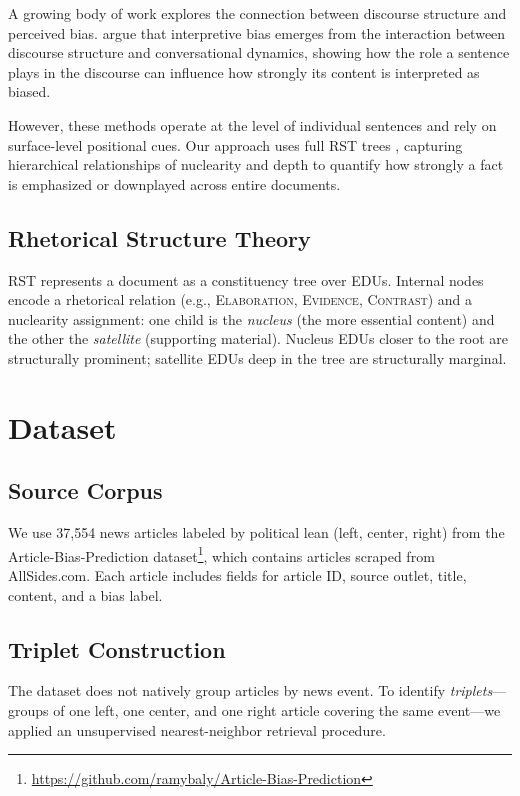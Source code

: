 \documentclass[11pt]{article}
\begin{document}
A growing body of work explores the connection between discourse structure and perceived bias. \citet{asher2018biassemanticdiscourseinterpretation} argue that interpretive bias emerges from the interaction between discourse structure and conversational dynamics, showing how the role a sentence plays in the discourse can influence how strongly its content is interpreted as biased.

However, these methods operate at the level of individual sentences and rely on surface-level positional cues. Our approach uses full RST trees \citep{nguyen2021rstparsingscratch}, capturing hierarchical relationships of nuclearity and depth to quantify how strongly a fact is emphasized or downplayed across entire documents.

\subsection{Rhetorical Structure Theory}

RST represents a document as a constituency tree over EDUs. Internal nodes encode a rhetorical relation (e.g., \textsc{Elaboration}, \textsc{Evidence}, \textsc{Contrast}) and a nuclearity assignment: one child is the \emph{nucleus} (the more essential content) and the other the \emph{satellite} (supporting material). Nucleus EDUs closer to the root are structurally prominent; satellite EDUs deep in the tree are structurally marginal.


\section{Dataset}

\subsection{Source Corpus}

We use 37,554 news articles labeled by political lean (left, center, right) from the Article-Bias-Prediction dataset\footnote{\url{https://github.com/ramybaly/Article-Bias-Prediction}}, which contains articles scraped from AllSides.com. Each article includes fields for article ID, source outlet, title, content, and a bias label.

\subsection{Triplet Construction}

The dataset does not natively group articles by news event. To identify \emph{triplets}---groups of one left, one center, and one right article covering the same event---we applied an unsupervised nearest-neighbor retrieval procedure.
\end{document}
